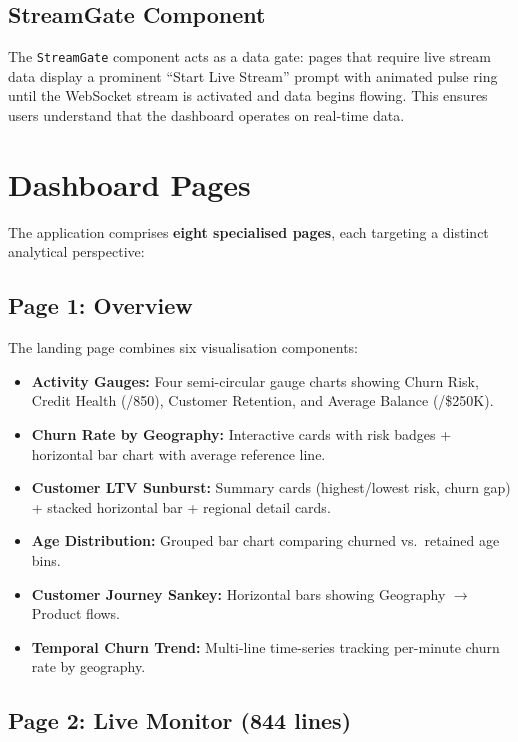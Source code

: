 \documentclass[12pt, a4paper]{report}
\begin{document}
\subsection{StreamGate Component}

The \texttt{StreamGate} component acts as a data gate: pages that require live stream data display a prominent ``Start Live Stream'' prompt with animated pulse ring until the WebSocket stream is activated and data begins flowing. This ensures users understand that the dashboard operates on real-time data.

\section{Dashboard Pages}

The application comprises \textbf{eight specialised pages}, each targeting a distinct analytical perspective:

\subsection{Page 1: Overview}

The landing page combines six visualisation components:
\begin{itemize}
    \item \textbf{Activity Gauges:} Four semi-circular gauge charts showing Churn Risk, Credit Health (/850), Customer Retention, and Average Balance (/\$250K).
    \item \textbf{Churn Rate by Geography:} Interactive cards with risk badges + horizontal bar chart with average reference line.
    \item \textbf{Customer LTV Sunburst:} Summary cards (highest/lowest risk, churn gap) + stacked horizontal bar + regional detail cards.
    \item \textbf{Age Distribution:} Grouped bar chart comparing churned vs.\ retained age bins.
    \item \textbf{Customer Journey Sankey:} Horizontal bars showing Geography $\to$ Product flows.
    \item \textbf{Temporal Churn Trend:} Multi-line time-series tracking per-minute churn rate by geography.
\end{itemize}

\subsection{Page 2: Live Monitor (844 lines)}
\end{document}
